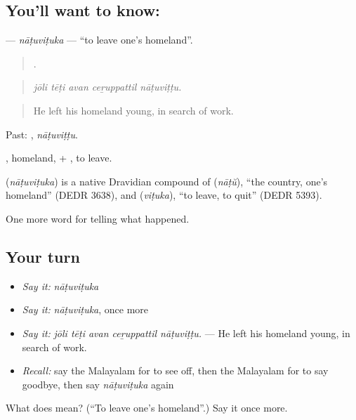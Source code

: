 \subsection*{You'll want to know: }
\textbf{} — \emph{nāṭuviṭuka} — \textquotedblleft{}to leave one's homeland\textquotedblright{}.

\begin{quote}
    .
\end{quote}

\begin{quote}
\emph{jōli tēṭi avan ceṟuppattil nāṭuviṭṭu.}
\end{quote}

\begin{quote}
He left his homeland young, in search of work.
\end{quote}

Past: , \emph{nāṭuviṭṭu}.

, homeland, + , to leave.

\begin{cousinweb}
\textbf{} (\emph{nāṭuviṭuka}) is a native Dravidian compound of  (\emph{nāṭŭ}), \textquotedblleft{}the country, one's homeland\textquotedblright{} (DEDR 3638), and  (\emph{viṭuka}), \textquotedblleft{}to leave, to quit\textquotedblright{} (DEDR 5393).
\end{cousinweb}

\begin{grammarlens}[title={What you've built}]
One more word for telling what happened.
\end{grammarlens}

\subsection*{Your turn}
\begin{itemize}
\raggedright
  \item \emph{Say it:} \emph{nāṭuviṭuka}
  \item \emph{Say it:} \emph{nāṭuviṭuka}, once more
  \item \emph{Say it:} \emph{jōli tēṭi avan ceṟuppattil nāṭuviṭṭu.} — He left his homeland young, in search of work.
  \item \emph{Recall:} say the Malayalam for to see off, then the Malayalam for to say goodbye, then say \emph{nāṭuviṭuka} again
\end{itemize}

\begin{tcolorbox}[breakable,colback=teal!4,colframe=teal!35!black,title={Before you move on}]
What does  mean? (\textquotedblleft{}To leave one's homeland\textquotedblright{}.) Say it once more.
\end{tcolorbox}
